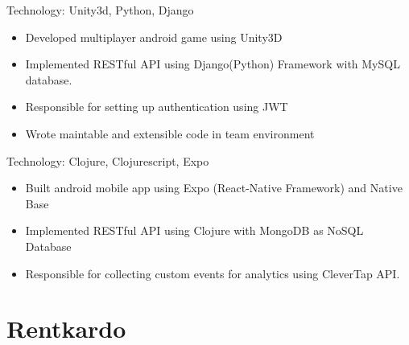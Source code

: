 \documentclass[11pt,a4paper,sans]{moderncv} %
\begin{document}
{Technology: Unity3d, Python, Django}{}{}
{\begin{itemize}
\item Developed multiplayer android game using Unity3D
\item Implemented RESTful API using Django(Python) Framework with MySQL database.
\item Responsible for setting up authentication using JWT
\item Wrote maintable and extensible code in team environment
\end{itemize}}

{Technology: Clojure, Clojurescript, Expo}{}{}
{\begin{itemize}
\item Built android mobile app using Expo (React-Native Framework) and Native Base
\item Implemented RESTful API using Clojure with MongoDB as NoSQL Database
\item Responsible for collecting custom events for analytics using CleverTap API.
\end{itemize}}



\section{Rentkardo}


\begin{comment}

\section{Bennett, Coleman \& Co. Ltd (BCCL - The Times Group)}

\cvitem{May'2016--Jul'2016}{
\vspace{-5mm}
\begin{itemize}
\item Research on OWASP Vulnerabilities.
\item Gained Hands on Testing Experience on DVWA using Burpsuite, sqlmap, nmap.
\item Understood Project Management of Security Projects
\end{itemize}
}
\end{comment}
\end{document}
